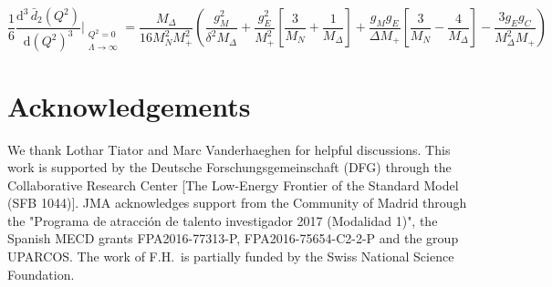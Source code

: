 \documentclass[twocolumn,prc,showpacs,nofootinbib,preprintnumbers,amsmath,amssymb,superscriptaddress]{revtex4-1}
\def\beq{\begin{equation}}
\def\eeq{\end{equation}}
\def\dd{\mathrm{d}}
\begin{document}
\begin{widetext}
\beq
\frac{1}{6}\frac{\dd^3\, \bar d_2(Q^2)}{\dd( Q^2)^3}\Bigg\vert_{\substack{Q^2=0\\ \Lambda \rightarrow \infty}}=\frac{M_\Delta}{16M_N^2M_+^2}\left(\frac{g_M^2}{ \delta ^2 M_\Delta}+\frac{g_E^2}{M_+^2}\left[\frac{3 }{ M_N}+\frac{1}{M_\Delta}\right]+\frac{g_M g_E}{\Delta M_+ }\left[\frac{3}{ M_N}-\frac{4}{M_\Delta}\right]-\frac{3 g_E g_C}{ M_\Delta^2 M_+}\right)
\eeq





\end{widetext}



\section*{Acknowledgements}

We thank Lothar Tiator and Marc Vanderhaeghen for helpful discussions. This work is supported by the Deutsche Forschungsgemeinschaft (DFG) through the
Collaborative Research Center [The Low-Energy Frontier of the Standard Model (SFB 1044)]. JMA acknowledges support from the Community of Madrid through the "Programa de atracci\'on de talento investigador 2017 (Modalidad 1)", the Spanish MECD grants FPA2016-77313-P, FPA2016-75654-C2-2-P and the group UPARCOS. The work of F.H.\ is partially funded by the Swiss National Science Foundation.
\end{document}
